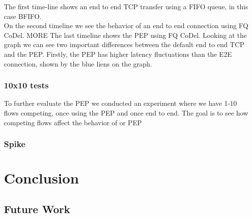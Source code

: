 \documentclass[a4paper,english, 11pt]{report}
\begin{document}
The first time-line shows an end to end TCP transfer using a FIFO queue, in this case BFIFO.\\ 
On the second timeline we see the behavior of an end to end connection using FQ CoDel. {MORE}
The last timeline shows the PEP using FQ CoDel. Looking at the graph we can see two important differences between the default end to end TCP and the PEP. Firstly, the PEP has higher latency fluctuations than the E2E connection, shown by the blue liens on the graph. 


\subsection{10x10 tests}
To further evaluate the PEP we conducted an experiment where we have 1-10 flows competing, once using the PEP and once end to end. The goal is to see how competing flows affect the behavior of or PEP

\subsection{Spike}

\chapter{Conclusion}

\section{Future Work}

{}

\end{document}
